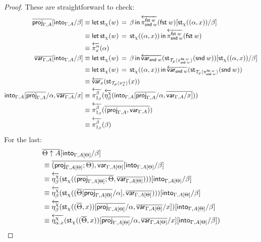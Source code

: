 \documentclass[10pt]{article}
\theoremstyle{definition}
\newcommand\dsd[1]{\ensuremath{\mathsf{#1}}}
\newcommand{\app}[2]{\ensuremath{#1 \: #2}}
\newcommand{\fst}[1]{\app{\dsd{fst}}{#1}}
\newcommand{\snd}[1]{\app{\dsd{snd}}{#1}}
\newcommand{\rewrite}[2]{\overleftarrow{#1}(#2)}
\newcommand\StI[2]{\ensuremath{\mathsf{st}_{#1}(#2)}}
\newcommand\StE[4]{\ensuremath{\mathsf{let} \, \StI{#1}{#3} \, = \, {#2} \, \mathsf{in} \, #4}}
\newcommand\ApEl[2]{\mathcal{T}_{#1}\langle#2\rangle}
\begin{document}
\begin{proof}
These are straightforward to check:
\begin{align*}
\upstairs{\proj{\Gamma, A}}[\into{\Gamma, A}/\beta] 
&\equiv \StE{\chi}{\beta}{w}{\rewrite{\pi^{\fst w}_{\snd w}}{\fst w}}[\StI{\chi}{(\alpha, x)}/\beta] \\
&\equiv \StE{\chi}{\StI{\chi}{(\alpha, x)}}{w}{\rewrite{\pi^{\fst w}_{\snd w}}{\fst w}} \\
&\equiv \rewrite{\pi^\alpha_x}{\alpha} \\
\upstairs{\var{\Gamma, A}}[\into{\Gamma, A}/\beta]
&\equiv  \StE{\chi}{\beta}{w}{\rewrite{\var{\snd w}}{\StI{\ApEl{p}{\pi^{\fst w}_{\snd w}}}{\snd w}}}[\StI{\chi}{(\alpha, x)}/\beta]  \\
&\equiv \StE{\chi}{\StI{\chi}{(\alpha, x)}}{w}{\rewrite{\var{\snd w}}{\StI{\ApEl{p}{\pi^{\fst w}_{\snd w}}}{\snd w}}} \\
&\equiv \rewrite{\var{x}}{\StI{\ApEl{p}{\pi^{\alpha}_x}}{x}} \\
\into{\Gamma, A}[\upstairs{\proj{\Gamma, A}}/\alpha, \upstairs{\var{\Gamma, A}}/x]
&\equiv \rewrite{\pi^\beta_{1_\beta}}{\rewrite{\eta^\chi_\beta}{\into{\Gamma, A}[\upstairs{\proj{\Gamma, A}}/\alpha, \upstairs{\var{\Gamma, A}/x]}}} \\
&\equiv \rewrite{\pi^\beta_{1_\beta}}{\upstairs{(\proj{\Gamma, A},\var{\Gamma, A})}} \\
&\equiv \rewrite{\pi^\beta_{1_\beta}}{\beta}
\end{align*}
For the last:
\begin{align*}
&\upstairs{\Theta \uparrow A}[\into{\Gamma, A[\Theta]}/\beta] \\
&\equiv \upstairs{(\proj{\Gamma, A[\Theta]}; \Theta) , \var{\Gamma, A[\Theta]}} [\into{\Gamma, A[\Theta]}/\beta] \\
&\equiv \rewrite{\eta^\chi_\beta}{\StI{\chi}{(\upstairs{\proj{\Gamma, A[\Theta]}; \Theta}, \upstairs{\var{\Gamma, A[\Theta]}})}}[\into{\Gamma, A[\Theta]}/\beta] \\
&\equiv \rewrite{\eta^\chi_\beta}{\StI{\chi}{(\upstairs{\Theta}[\upstairs{\proj{\Gamma, A[\Theta]}}/\alpha], \upstairs{\var{\Gamma, A[\Theta]}})}}[\into{\Gamma, A[\Theta]}/\beta] \\
&\equiv \rewrite{\eta^\chi_\beta}{\StI{\chi}{(\upstairs{\Theta}, x)}[\upstairs{\proj{\Gamma, A[\Theta]}}/\alpha, \upstairs{\var{\Gamma, A[\Theta]}}/x]}[\into{\Gamma, A[\Theta]}/\beta] \\
&\equiv \rewrite{\eta^\chi_{\alpha.x}}{\StI{\chi}{(\upstairs{\Theta}, x)}[\upstairs{\proj{\Gamma, A[\Theta]}}/\alpha, \upstairs{\var{\Gamma, A[\Theta]}}/x][\into{\Gamma, A[\Theta]}/\beta]} \\

\end{align*}
\end{proof}
\end{document}

